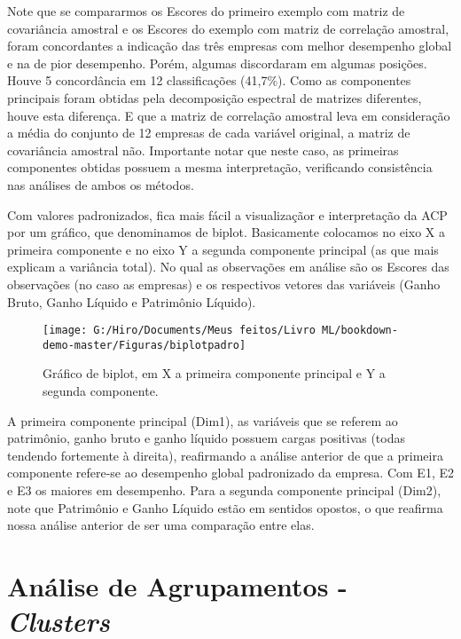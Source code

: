 \documentclass[
  openany]{book}
\begin{document}
Note que se compararmos os Escores do primeiro exemplo com matriz de covariância amostral e os Escores do exemplo com matriz de correlação amostral, foram concordantes a indicação das três empresas com melhor desempenho global e na de pior desempenho. Porém, algumas discordaram em algumas posições. Houve 5 concordância em 12 classificações (41,7\%). Como as componentes principais foram obtidas pela decomposição espectral de matrizes diferentes, houve esta diferença. E que a matriz de correlação amostral leva em consideração a média do conjunto de 12 empresas de cada variável original, a matriz de covariância amostral não. Importante notar que neste caso, as primeiras componentes obtidas possuem a mesma interpretação, verificando consistência nas análises de ambos os métodos.

Com valores padronizados, fica mais fácil a visualizaçãor e interpretação da ACP por um gráfico, que denominamos de biplot. Basicamente colocamos no eixo X a primeira componente e no eixo Y a segunda componente principal (as que mais explicam a variância total). No qual as observações em análise são os Escores das observações (no caso as empresas) e os respectivos vetores das variáveis (Ganho Bruto, Ganho Líquido e Patrimônio Líquido).

\begin{figure}

{\centering \texttt{[image: G:/Hiro/Documents/Meus feitos/Livro ML/bookdown-demo-master/Figuras/biplotpadro]} 

}

\caption{Gráfico de biplot, em X a primeira componente principal e Y a segunda componente.}\label{fig:biplotpadro}
\end{figure}



A primeira componente principal (Dim1), as variáveis que se referem ao patrimônio, ganho bruto e ganho líquido possuem cargas positivas (todas tendendo fortemente à direita), reafirmando a análise anterior de que a primeira componente refere-se ao desempenho global padronizado da empresa. Com E1, E2 e E3 os maiores em desempenho.
Para a segunda componente principal (Dim2), note que Patrimônio e Ganho Líquido estão em sentidos opostos, o que reafirma nossa análise anterior de ser uma comparação entre elas.

\hypertarget{anuxe1lise-de-agrupamentos---clusters}{%
\section{\texorpdfstring{Análise de Agrupamentos - \emph{Clusters}}{Análise de Agrupamentos - Clusters}}\label{anuxe1lise-de-agrupamentos---clusters}}
\end{document}
